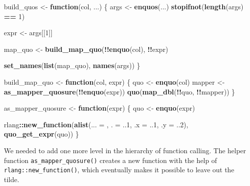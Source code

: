 \documentclass[]{book}
\newenvironment{Shaded}{\begin{snugshade}}{\end{snugshade}}
\newcommand{\ControlFlowTok}[1]{\textcolor[rgb]{0.13,0.29,0.53}{\textbf{#1}}}
\newcommand{\DataTypeTok}[1]{\textcolor[rgb]{0.13,0.29,0.53}{#1}}
\newcommand{\DecValTok}[1]{\textcolor[rgb]{0.00,0.00,0.81}{#1}}
\newcommand{\KeywordTok}[1]{\textcolor[rgb]{0.13,0.29,0.53}{\textbf{#1}}}
\newcommand{\NormalTok}[1]{#1}
\newcommand{\OperatorTok}[1]{\textcolor[rgb]{0.81,0.36,0.00}{\textbf{#1}}}
\newcommand{\StringTok}[1]{\textcolor[rgb]{0.31,0.60,0.02}{#1}}
\begin{document}
\begin{Shaded}
\begin{Highlighting}[]
\NormalTok{build_quos <-}\StringTok{ }\ControlFlowTok{function}\NormalTok{(col, ...) \{}
\NormalTok{  args <-}\StringTok{ }\KeywordTok{enquos}\NormalTok{(...)}
  \KeywordTok{stopifnot}\NormalTok{(}\KeywordTok{length}\NormalTok{(args) }\OperatorTok{==}\StringTok{ }\DecValTok{1}\NormalTok{)}

\NormalTok{  expr <-}\StringTok{ }\NormalTok{args[[}\DecValTok{1}\NormalTok{]]}

\NormalTok{  map_quo <-}\StringTok{ }\KeywordTok{build_map_quo}\NormalTok{(}\OperatorTok{!!}\KeywordTok{enquo}\NormalTok{(col), }\OperatorTok{!!}\NormalTok{expr)}

  \KeywordTok{set_names}\NormalTok{(}\KeywordTok{list}\NormalTok{(map_quo), }\KeywordTok{names}\NormalTok{(args))}
\NormalTok{\}}

\NormalTok{build_map_quo <-}\StringTok{ }\ControlFlowTok{function}\NormalTok{(col, expr) \{}
\NormalTok{  quo <-}\StringTok{ }\KeywordTok{enquo}\NormalTok{(col)}
\NormalTok{  mapper <-}\StringTok{ }\KeywordTok{as_mapper_quosure}\NormalTok{(}\OperatorTok{!!}\KeywordTok{enquo}\NormalTok{(expr))}
  \KeywordTok{quo}\NormalTok{(}\KeywordTok{map_dbl}\NormalTok{(}\OperatorTok{!!}\NormalTok{quo, }\OperatorTok{!!}\NormalTok{mapper))}
\NormalTok{\}}

\NormalTok{as_mapper_quosure <-}\StringTok{ }\ControlFlowTok{function}\NormalTok{(expr) \{}
\NormalTok{  quo <-}\StringTok{ }\KeywordTok{enquo}\NormalTok{(expr)}

\NormalTok{  rlang}\OperatorTok{::}\KeywordTok{new_function}\NormalTok{(}\KeywordTok{alist}\NormalTok{(}\DataTypeTok{... =}\NormalTok{ , }\DataTypeTok{. =}\NormalTok{ ..}\DecValTok{1}\NormalTok{, }\DataTypeTok{.x =}\NormalTok{ ..}\DecValTok{1}\NormalTok{, }\DataTypeTok{.y =}\NormalTok{ ..}\DecValTok{2}\NormalTok{), }\KeywordTok{quo_get_expr}\NormalTok{(quo))}
\NormalTok{\}}
\end{Highlighting}
\end{Shaded}

We needed to add one more level in the hierarchy of function calling.
The helper function \texttt{as\_mapper\_quosure()} creates a new function with the help of \texttt{rlang::new\_function()}, which eventually makes it possible to leave out the tilde.

\begin{Shaded}
\end{Shaded}
\end{document}
